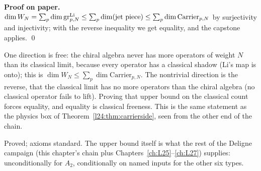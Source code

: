 \textbf{Proof on paper.} $\dim W_N=\sum_p\dim\operatorname{gr}^{\mathrm{Li}}_{p,N}\le\sum_p\dim(\text{jet piece})\le\sum_p\dim\mathrm{Carrier}_{p,N}$
by surjectivity and injectivity; with the reverse inequality we get equality, and the capstone applies. \qed

\begin{physics}
One direction is free: the chiral algebra never has more operators of weight $N$ than its classical limit, because
every operator has a classical shadow (Li's map is onto); this is $\dim W_N\le\sum_p\dim\mathrm{Carrier}_{p,N}$. The
nontrivial direction is the reverse, that the classical limit has no more operators than the chiral algebra (no
classical operator fails to lift). Proving that upper bound on the classical count forces equality, and equality is
classical freeness. This is the same statement as the physics box of Theorem~\ref{l24:thm:carrierside}, seen from the
other end of the chain.
\end{physics}

\begin{status}
Proved; axioms standard. The upper bound itself is what the rest of the Deligne campaign
(this chapter's chain plus Chapters~\ref{ch:L25}--\ref{ch:L27}) supplies: unconditionally for $A_2$, conditionally on
named inputs for the other six types.
\end{status}

